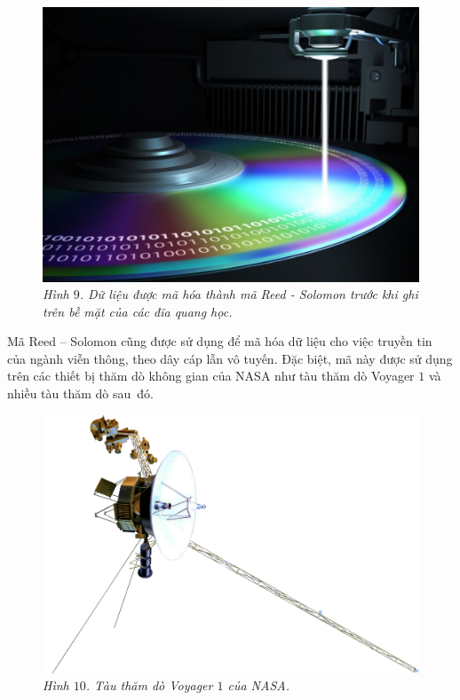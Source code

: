 \begin{multicols}{2}
\begin{figure}[H]
		\includegraphics[width= 1\linewidth]{17}
		\caption{\small\textit{\color{toanhocdoisong}Hình $9$. Dữ liệu được mã hóa thành mã Reed - Solomon trước khi ghi trên bề mặt của các đĩa quang học.}}
		\vspace*{-10pt}
	\end{figure}
	Mã Reed -- Solomon cũng được sử dụng để mã hóa dữ liệu cho việc truyền tin của ngành viễn thông, theo dây cáp lẫn vô tuyến. Đặc biệt, mã này được sử dụng trên các thiết bị thăm dò không gian của NASA như tàu thăm dò Voyager $1$ và nhiều tàu thăm dò sau~đó.
	\begin{figure}[H]
		\vspace*{-5pt}
		\centering
		\captionsetup{labelformat= empty, justification=centering}
		\includegraphics[width= 0.95\linewidth]{18}
		\caption{\small\textit{\color{toanhocdoisong}Hình $10$. Tàu thăm dò Voyager $1$ của NASA.}}

\end{figure}
\end{multicols}

